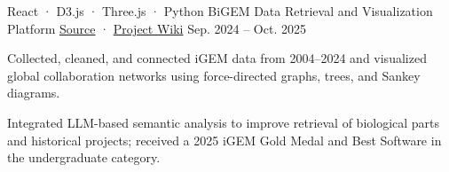 \begin{cventries}
\vspace{0.8cm} %
  \cventry
    {React · D3.js · Three.js · Python}
    {BiGEM Data Retrieval and Visualization Platform}
    {\href{https://gitlab.igem.org/2025/software-tools/bit-china}{Source} · \href{https://2025.igem.wiki/bit-china/software}{Project Wiki}}
    {Sep. 2024 -- Oct. 2025}
    {
      \begin{cvitems}
        \item {Collected, cleaned, and connected iGEM data from 2004--2024 and visualized global collaboration networks using force-directed graphs, trees, and Sankey diagrams.}
        \item {Integrated LLM-based semantic analysis to improve retrieval of biological parts and historical projects; received a 2025 iGEM Gold Medal and Best Software in the undergraduate category.}
      \end{cvitems}
    }

\end{cventries}

